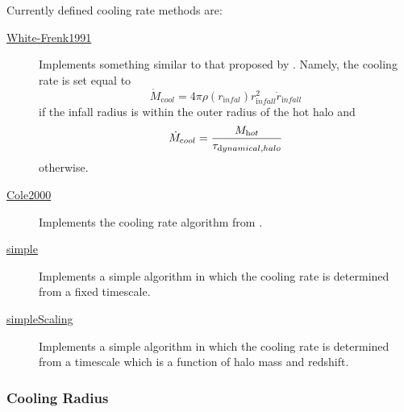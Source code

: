 Currently defined cooling rate methods are:
\begin{description}
 \item [\hyperlink{cooling.cooling_rate.White-Frenk.F90:cooling_rates_white_frenk:cooling_rate_white_frenk}{{\normalfont \ttfamily White-Frenk1991}}] Implements something similar to that proposed by \cite{white_galaxy_1991}. Namely, the cooling rate is set equal to
 \begin{equation}
  \dot{M}_{\mathrm cool} = 4 \pi \rho(r_{\mathrm infal}) r_{\mathrm infall}^2 \dot{r}_{\mathrm infall}
 \end{equation}
 if the infall radius is within the outer radius of the hot halo and
 \begin{equation}
  \dot{M}_{\mathrm cool} = {M_{\mathrm hot} \over \tau_{\mathrm dynamical,halo}}
 \end{equation}
 otherwise.
\item [\hyperlink{cooling.cooling_rate.Cole2000.F90:cooling_rates_cole2000:cooling_rate_cole2000}{{\normalfont \ttfamily Cole2000}}] Implements the cooling rate algorithm from \cite{cole_hierarchical_2000}.
\item [\hyperlink{cooling.cooling_rate.simple.F90:cooling_rates_simple:cooling_rate_simple}{{\normalfont \ttfamily simple}}] Implements a simple algorithm in which the cooling rate is determined from a fixed timescale.
\item [\hyperlink{cooling.cooling_rate.simple_scaling.F90:cooling_rates_simple_scaling:cooling_rate_simple_scaling}{{\normalfont \ttfamily simpleScaling}}] Implements a simple algorithm in which the cooling rate is determined from a timescale which is a function of halo mass and redshift.
\end{description}

\subsubsection{Cooling Radius}

